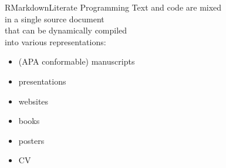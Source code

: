 \documentclass[12pt,t]{beamer}
\begin{document}
{\begin{frame}[c]{RMarkdown\textemdash{}Literate Programming}
  Text and code are mixed\\
  in a single source document\\
  that can be \textcolor{hilit}{dynamically} compiled\\
  into various representations:
  \begin{itemize}
    \item (APA conformable) manuscripts
    \item presentations
    \item websites
    \item books
    \item posters
		\item CV
  \end{itemize}
\end{frame}

}
\end{document}
